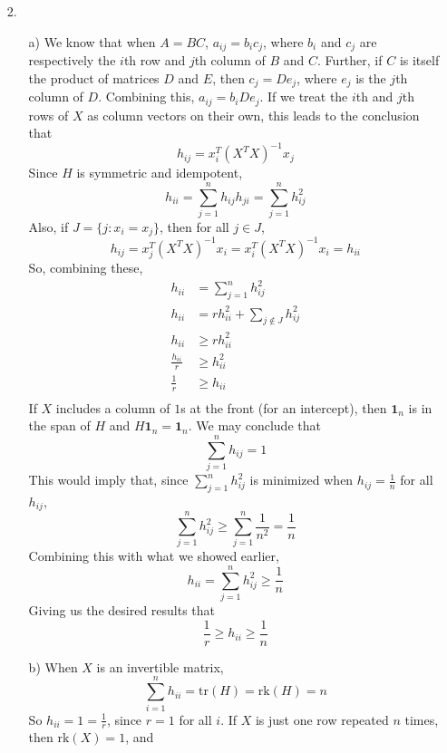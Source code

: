 \documentclass[11pt]{article}
\theoremstyle{definition}
\begin{document}
\begin{itemize}
    \item[2.]
        \begin{itemize}
            \item[a)]
                We know that when $A=BC$, $a_{ij}=b_i c_j$, where $b_i$ and $c_j$ are respectively the $i$th row and $j$th column of $B$ and $C$. Further, if $C$ is itself the product of matrices $D$ and $E$, then $c_j=De_j$, where $e_j$ is the $j$th column of $D$. Combining this, $a_{ij}=b_i D e_j$. If we treat the $i$th and $j$th rows of $X$ as column vectors on their own, this leads to the conclusion that
                \[h_{ij}=x_i^T(X^TX)^{-1}x_j\]
                \smallskip
                Since $H$ is symmetric and idempotent,
                \[h_{ii}=\sum_{j=1}^n h_{ij}h_{ji} = \sum_{j=1}^n h_{ij}^2 \]
                Also, if \(J=\{j:x_i=x_j\}\), then for all \(j\in J\),
                \[h_{ij} = x_j^T (X^TX)^{-1} x_i = x_i^T (X^TX)^{-1} x_i = h_{ii} \]
                So, combining these,
                \begin{align*}
                    h_{ii} &= \sum_{j=1}^n h_{ij}^2 \\
                    h_{ii} &= r h_{ii}^2 + \sum_{j\not\in J} h_{ij}^2 \\
                    h_{ii} &\geq r h_{ii}^2 \\
                    \frac{h_{ii}}{r} &\geq h_{ii}^2  \\
                    \frac{1}{r} &\geq h_{ii} \\
                \end{align*}
                \smallskip
                If $X$ includes a column of $1$s at the front (for an intercept), then $\mathbf{1}_n$ is in the span of $H$ and $H\mathbf{1}_n=\mathbf{1}_n$. We may conclude that 
                \[\sum_{j=1}^n h_{ij} = 1 \]
                This would imply that, since $\sum_{j=1}^n h_{ij}^2$ is minimized when $h_{ij}=\frac{1}{n}$ for all $h_{ij}$,
                \[\sum_{j=1}^n h_{ij}^2 \geq \sum_{j=1}^n \frac{1}{n^2} = \frac{1}{n} \]
                Combining this with what we showed earlier,
                \[h_{ii} = \sum_{j=1}^n h_{ij}^2 \geq \frac{1}{n}\]
                Giving us the desired results that 
                \[\frac{1}{r} \geq h_{ii} \geq \frac{1}{n} \]
            \item[b)]
                When $X$ is an invertible matrix, 
                \[\sum_{i=1}^n h_{ii} = \mathrm{tr}(H) = \mathrm{rk}(H) = n\]
                So $h_{ii}=1=\frac{1}{r}$, since $r=1$ for all $i$. If $X$ is just one row repeated $n$ times, then $\mathrm{rk}(X)=1$, and 

\end{itemize}
\end{itemize}
\end{document}
